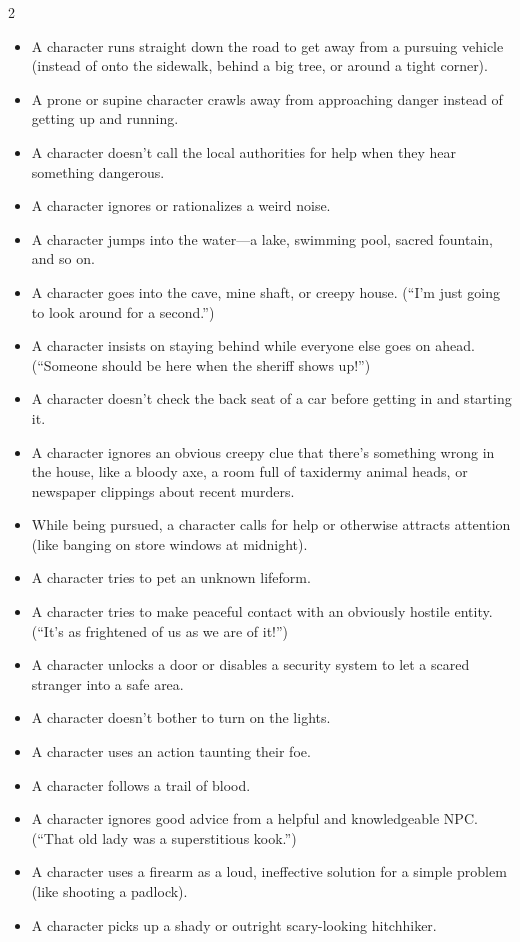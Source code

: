 \begin{multicols}{2}
\begin{itemize}
\item A character runs straight down the road to get away from a pursuing vehicle (instead of onto the sidewalk, behind a big tree, or around a tight corner).
\item A prone or supine character crawls away from approaching danger instead of getting up and running.
\item A character doesn’t call the local authorities for help when they hear something dangerous.
\item A character ignores or rationalizes a weird noise. 
\item A character jumps into the water—a lake, swimming pool, sacred fountain, and so on.
\item A character goes into the cave, mine shaft, or creepy house. (“I’m just going to look around for a second.”)
\item A character insists on staying behind while everyone else goes on ahead. (“Someone should be here when the sheriff shows up!”)
\item A character doesn’t check the back seat of a car before getting in and starting it.
\item A character ignores an obvious creepy clue that there’s something wrong in the house, like a bloody axe, a room full of taxidermy animal heads, or newspaper clippings about recent murders.
\item While being pursued, a character calls for help or otherwise attracts attention (like banging on store windows at midnight).
\item A character tries to pet an unknown lifeform.
\item A character tries to make peaceful contact with an obviously hostile entity. (“It’s as frightened of us as we are of it!”)
\item A character unlocks a door or disables a security system to let a scared stranger into a safe area. 
\item A character doesn’t bother to turn on the lights. 
\item A character uses an action taunting their foe.
\item A character follows a trail of blood.
\item A character ignores good advice from a helpful and knowledgeable NPC. (“That old lady was a superstitious kook.”)
\item A character uses a firearm as a loud, ineffective solution for a simple problem (like shooting a padlock).
\item A character picks up a shady or outright scary-looking hitchhiker.

\end{itemize}
\end{multicols}
